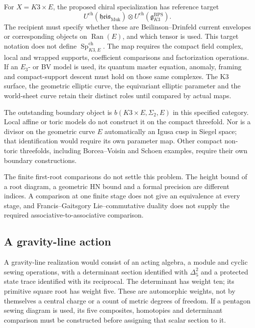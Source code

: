 For \(X=K3\times E\), the proposed chiral specialization has
reference target
\[
 U^{\mathrm{ch}}(\mathfrak{heis}_{\mathrm{Muk}})
       \otimes U^{\mathrm{ch}}(\mathfrak g^{\mathrm{BPS}}_{K3}).
\]
The recipient must specify whether these are
Beilinson--Drinfeld current envelopes or corresponding objects on
\(\operatorname{Ran}(E)\), and which tensor is used.
This target notation does not define
\(\operatorname{Sp}^{\mathrm{ch}}_{K3,E}\).
The map requires the compact field complex, local and wrapped
supports, coefficient comparisons and factorization operations.
If an \(E_3\)- or BV model is used, its quantum master equation,
anomaly, framing and compact-support descent must hold on those
same complexes. The K3 surface, the geometric elliptic curve,
the equivariant elliptic parameter and the world-sheet curve
retain their distinct roles until compared by actual maps.

The outstanding boundary object is
\(b(K3\times E,\Sigma_2,E)\) in this specified category.
Local affine or toric models do not construct it on the compact
threefold. Nor is a divisor on the geometric curve \(E\)
automatically an Igusa cusp in Siegel space; that identification
would require its own parameter map. Other compact non-toric
threefolds, including Borcea--Voisin and Schoen examples, require
their own boundary constructions.

The finite first-root comparisons do not settle this problem.
The height bound of a root diagram, a geometric HN bound and a
formal precision are different indices. A comparison at one
finite stage does not give an equivalence at every stage, and
Francis--Gaitsgory Lie--commutative duality does not supply the
required associative-to-associative comparison.

\subsection{A gravity-line action}
\label{subsubsec:open-gravity-line}

A gravity-line realization would consist of an acting algebra, a
module and cyclic sewing operations, with a determinant section
identified with \(\Delta_5^2\) and a protected state trace
identified with its reciprocal. The determinant has weight ten;
its primitive square root has weight five. These are automorphic
weights, not by themselves a central charge or a count of metric
degrees of freedom. If a pentagon sewing diagram is used, its
five composites, homotopies and determinant comparison must be
constructed before assigning that scalar section to it.

